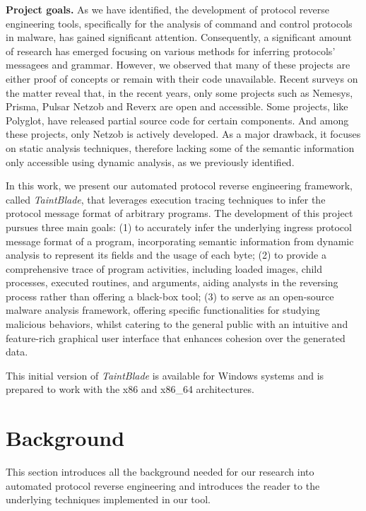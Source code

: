 \documentclass[conference]{IEEEtran}
\begin{document}
\textbf{Project goals.}
As we have identified, the development of
protocol reverse engineering tools, specifically for the analysis of command and control protocols in malware, has gained significant attention.
Consequently, a significant amount of research has emerged focusing on various methods for inferring protocols' messagees and grammar.
However, we observed that many of these projects are either proof of concepts
or remain with their code unavailable. Recent
surveys on the matter\cite{apre_survey}\cite{apre_survey2} reveal that, in the recent years, only some projects such as Nemesys\cite{github_pre_nemesys}, Prisma\cite{github_pre_prisam}, Pulsar\cite{github_pre_pulsar}
Netzob\cite{github_pre_netzob} and Reverx\cite{github_pre_reverx} are open and accessible.
Some projects, like Polyglot\cite{polyglot_caballero}, have released partial source code for certain components.
And among these projects, only Netzob is actively developed. As a major drawback, it focuses on static analysis techniques, therefore lacking some of the semantic information
only accessible using dynamic analysis, as we previously identified.

In this work, we present our automated protocol reverse engineering framework,
called \textit{TaintBlade}, that leverages execution tracing techniques to
infer the protocol message format of arbitrary programs. The development of
this project pursues three main goals: (1) to accurately infer the underlying
ingress protocol message format of a program, incorporating semantic
information from dynamic analysis to represent its fields and the usage of each
byte; (2) to provide a comprehensive trace of program activities, including
loaded images, child processes, executed routines, and arguments, aiding
analysts in the reversing process rather than offering a black-box tool; (3) to
serve as an open-source malware analysis framework, offering specific
functionalities for studying malicious behaviors, whilst catering to the
general public with an intuitive and feature-rich graphical user interface that
enhances cohesion over the generated data.

This initial version of \textit{TaintBlade} is available for Windows systems
and is prepared to work with the x86 and x86\_64 architectures.

\section{Background}
This section introduces all the background needed for our research into
automated protocol reverse engineering and introduces the reader to the
underlying techniques implemented in our tool.
\end{document}
